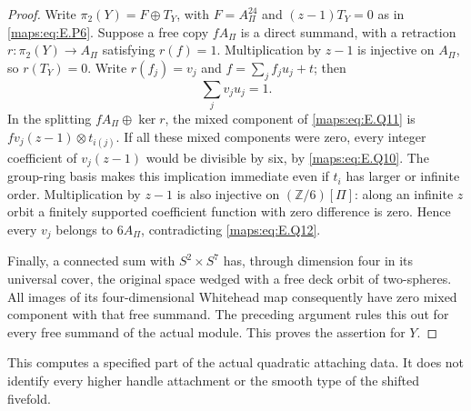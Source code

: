 \begin{proof}
Write $\pi_2(Y)=F\oplus T_Y$, with $F=A_\Pi^{24}$ and
$(z-1)T_Y=0$ as in \eqref{maps:eq:E.P6}.  Suppose a free copy $fA_\Pi$
is a direct summand, with a retraction $r:\pi_2(Y)\to A_\Pi$
satisfying $r(f)=1$.  Multiplication by $z-1$ is injective
on $A_\Pi$, so $r(T_Y)=0$.  Write $r(f_j)=v_j$ and
$f=\sum_j f_j u_j+t$; then
\[
                         \sum_j v_j u_j=1.
 \tag{E.Q12}\label{maps:eq:E.Q12}
\]
In the splitting $fA_\Pi\oplus\ker r$, the mixed component
of \eqref{maps:eq:E.Q11} is $f v_j(z-1)\otimes t_{i(j)}$.  If all these
mixed components were zero, every integer coefficient of
$v_j(z-1)$ would be divisible by six, by \eqref{maps:eq:E.Q10}.  The
group-ring basis makes this implication immediate even if
$t_i$ has larger or infinite order.  Multiplication by
$z-1$ is also injective on $(\mathbb Z/6)[\Pi]$: along an
infinite $z$ orbit a finitely supported coefficient function
with zero difference is zero.  Hence every $v_j$ belongs
to $6A_\Pi$, contradicting \eqref{maps:eq:E.Q12}.

Finally, a connected sum with $S^2\times S^7$ has, through
dimension four in its universal cover, the original space
wedged with a free deck orbit of two-spheres.  All images
of its four-dimensional Whitehead map consequently have
zero mixed component with that free summand.  The preceding
argument rules this out for every free summand of the actual
module.  This proves the assertion for $Y$.
\end{proof}

This computes a specified part of the actual quadratic
attaching data.  It does not identify every higher handle
attachment or the smooth type of the shifted fivefold.




